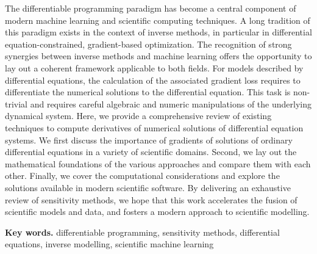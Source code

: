 
The differentiable programming paradigm has become a central component of modern machine learning and scientific computing techniques. 
A long tradition of this paradigm exists in the context of inverse methods, in particular in differential equation-constrained, gradient-based optimization.
The recognition of strong synergies between inverse methods and machine learning offers the opportunity to lay out a coherent framework applicable to both fields.
For models described by differential equations, the calculation of the associated gradient loss requires to differentiate the numerical solutions to the differential equation. 
This task is non-trivial and requires careful algebraic and numeric manipulations of the underlying dynamical system.
Here, we provide a comprehensive review of existing techniques to compute derivatives of numerical solutions of differential equation systems.
We first discuss the importance of gradients of solutions of ordinary differential equations in a variety of scientific domains.
Second, we lay out the mathematical foundations of the various approaches and compare them with each other. 
Finally, we cover the computational considerations and explore the solutions available in modern scientific software. 
By delivering an exhaustive review of sensitivity methods, we hope that this work accelerates the fusion of scientific models and data, and fosters a modern approach to scientific modelling.

\vspace{30px}
\noindent \textbf{Key words.} differentiable programming, sensitivity methods, differential equations, inverse modelling, scientific machine learning